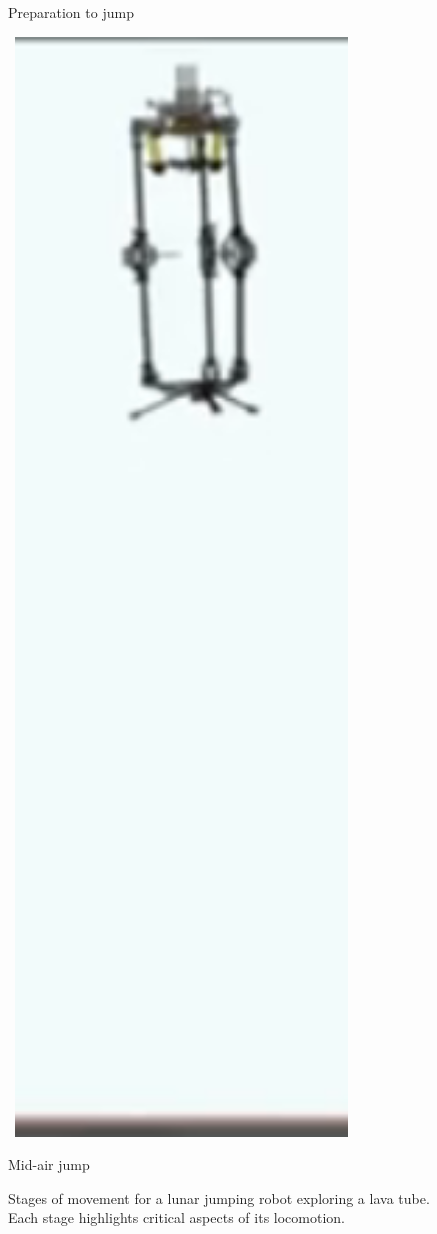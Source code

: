 \begin{figure}[H]
\begin{minipage}[b]{0.15\textwidth}
        \caption*{Preparation to jump}
    \end{minipage}
    \hspace{0.02\textwidth}
    \begin{minipage}[b]{0.15\textwidth}
        \centering
        \includegraphics[width=0.82\textwidth]{daedalus-jumper-3.png}
        \caption*{Mid-air jump}
    \end{minipage}
    \caption{Stages of movement for a lunar jumping robot exploring a lava tube. Each stage highlights critical aspects of its locomotion.}
    \label{fig:lunar_robot_movement}
\end{figure}


